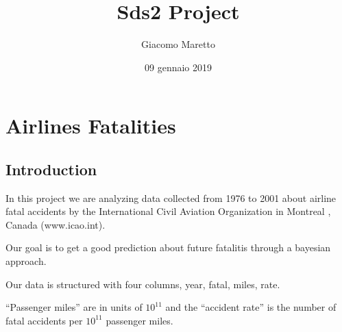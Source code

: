 \documentclass[]{article}
\title{Sds2 Project}
\author{Giacomo Maretto}
\date{09 gennaio 2019}
\begin{document}
\maketitle

\section{Airlines Fatalities}\label{airlines-fatalities}

\subsection{Introduction}\label{introduction}

In this project we are analyzing data collected from 1976 to 2001 about
airline fatal accidents by the International Civil Aviation Organization
in Montreal , Canada (www.icao.int).

Our goal is to get a good prediction about future fatalitis through a
bayesian approach.

Our data is structured with four columns, year, fatal, miles, rate.

``Passenger miles'' are in units of \(10^{11}\) and the ``accident
rate'' is the number of fatal accidents per \(10^{11}\) passenger miles.
\end{document}
